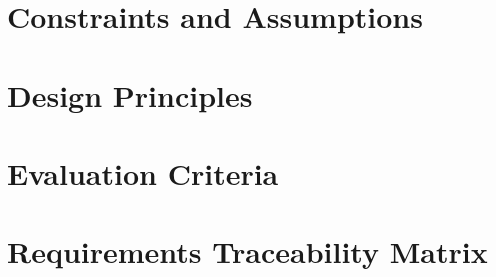 \documentclass[a4paper,twoside]{sapthesis}
\begin{document}
\section{Constraints and Assumptions}
\label{sec:constraints-assumptions}

\section{Design Principles}
\label{sec:design-principles}

\section{Evaluation Criteria}
\label{sec:evaluation-criteria}

\section{Requirements Traceability Matrix}
\label{sec:traceability-matrix}
%
%
%
\end{document}
